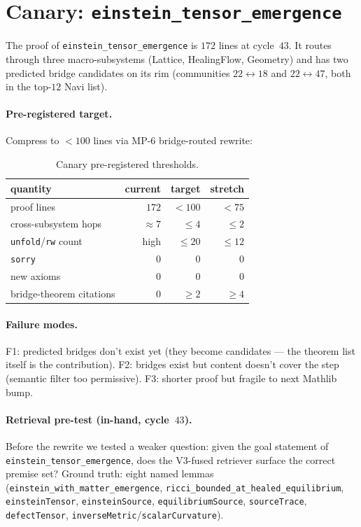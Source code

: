 \documentclass[11pt]{article}
\begin{document}
\section{Canary: \texttt{einstein\_tensor\_emergence}}
\label{sec:canary}

The proof of \lstinline|einstein_tensor_emergence| is $172$ lines at
cycle~$43$. It routes through three macro-subsystems (Lattice,
HealingFlow, Geometry) and has two predicted bridge candidates on its
rim (communities $22\leftrightarrow 18$ and $22\leftrightarrow 47$,
both in the top-$12$ Navi list).

\paragraph{Pre-registered target.}
Compress to $<100$ lines via MP-$6$ bridge-routed rewrite:

\begin{table}[h]
\centering
\small
\begin{tabular}{l r r r}
\toprule
quantity           & current & target  & stretch \\
\midrule
proof lines        & $172$   & $<100$  & $<75$ \\
cross-subsystem hops & $\approx 7$ & $\leq 4$ & $\leq 2$ \\
\lstinline|unfold|/\lstinline|rw| count & high & $\leq 20$ & $\leq 12$ \\
\lstinline|sorry|  & $0$     & $0$     & $0$ \\
new axioms         & $0$     & $0$     & $0$ \\
bridge-theorem citations & $0$ & $\geq 2$ & $\geq 4$ \\
\bottomrule
\end{tabular}
\caption{Canary pre-registered thresholds.}
\label{tab:canary}
\end{table}

\paragraph{Failure modes.}
F1: predicted bridges don't exist yet (they become candidates --- the
theorem list itself is the contribution).
F2: bridges exist but content doesn't cover the step (semantic filter
too permissive).
F3: shorter proof but fragile to next Mathlib bump.

\paragraph{Retrieval pre-test (in-hand, cycle~$43$).}
Before the rewrite we tested a weaker question: given the goal
statement of \lstinline|einstein_tensor_emergence|, does the V3-fused
retriever surface the correct premise set? Ground truth: eight named
lemmas (\lstinline|einstein_with_matter_emergence|,
\lstinline|ricci_bounded_at_healed_equilibrium|,
\lstinline|einsteinTensor|, \lstinline|einsteinSource|,
\lstinline|equilibriumSource|, \lstinline|sourceTrace|,
\lstinline|defectTensor|, \lstinline|inverseMetric|/\lstinline|scalarCurvature|).
\end{document}
